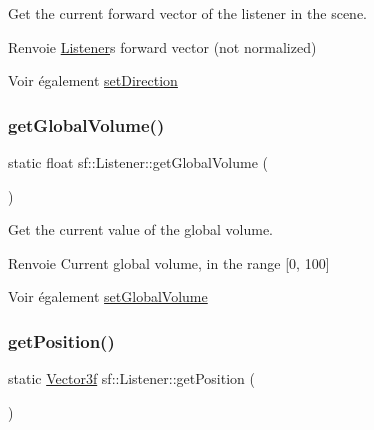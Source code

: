 Get the current forward vector of the listener in the scene. 

\begin{DoxyReturn}{Renvoie}
\hyperlink{classsf_1_1Listener}{Listener}\textquotesingle{}s forward vector (not normalized)
\end{DoxyReturn}
\begin{DoxySeeAlso}{Voir également}
\hyperlink{classsf_1_1Listener_ae479dc15513c6557984d26e32d06d06e}{set\+Direction} 
\end{DoxySeeAlso}
\mbox{\label{classsf_1_1Listener_a137ea535799bdf70be6ec969673d4d33}} 
\subsubsection{\texorpdfstring{get\+Global\+Volume()}{getGlobalVolume()}}
{\footnotesize\ttfamily static float sf\+::\+Listener\+::get\+Global\+Volume (\begin{DoxyParamCaption}{ }\end{DoxyParamCaption})\hspace{0.3cm}{\ttfamily [static]}}



Get the current value of the global volume. 

\begin{DoxyReturn}{Renvoie}
Current global volume, in the range \mbox{[}0, 100\mbox{]}
\end{DoxyReturn}
\begin{DoxySeeAlso}{Voir également}
\hyperlink{classsf_1_1Listener_a803a24a1fc04620cacc9f88c6fbc0e3a}{set\+Global\+Volume} 
\end{DoxySeeAlso}
\mbox{\label{classsf_1_1Listener_acd7ee65bc948ca38e1c669aa12340c54}} 
\subsubsection{\texorpdfstring{get\+Position()}{getPosition()}}
{\footnotesize\ttfamily static \hyperlink{classsf_1_1Vector3}{Vector3f} sf\+::\+Listener\+::get\+Position (\begin{DoxyParamCaption}{ }\end{DoxyParamCaption})\hspace{0.3cm}{\ttfamily [static]}}



